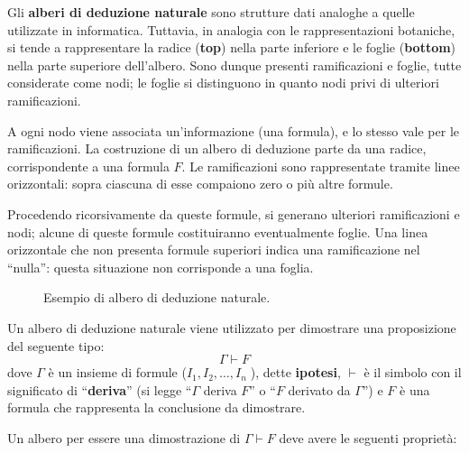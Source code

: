 \documentclass[
  a4paper,
]{article}
\newenvironment{scaledprooftree}[1]
  {\gdef\scalefactor{#1}\begin{center}\proofSkipAmount \leavevmode}%
  {\scalebox{\scalefactor}{\DisplayProof}\proofSkipAmount \end{center}}
\begin{document}
Gli \textbf{alberi di deduzione naturale} sono strutture dati analoghe a
quelle utilizzate in informatica. Tuttavia, in analogia con le
rappresentazioni botaniche, si tende a rappresentare la radice
(\textbf{top}) nella parte inferiore e le foglie (\textbf{bottom}) nella
parte superiore dell'albero. Sono dunque presenti ramificazioni e
foglie, tutte considerate come nodi; le foglie si distinguono in quanto
nodi privi di ulteriori ramificazioni.

A ogni nodo viene associata un'informazione (una formula), e lo stesso
vale per le ramificazioni. La costruzione di un albero di deduzione
parte da una radice, corrispondente a una formula \(F\). Le
ramificazioni sono rappresentate tramite linee orizzontali: sopra
ciascuna di esse compaiono zero o più altre formule.

Procedendo ricorsivamente da queste formule, si generano ulteriori
ramificazioni e nodi; alcune di queste formule costituiranno
eventualmente foglie. Una linea orizzontale che non presenta formule
superiori indica una ramificazione nel ``nulla'': questa situazione non
corrisponde a una foglia.

\begin{figure}[h]
\centering
\begin{scaledprooftree}{.95}
  \def\defaultHypSeparation{\hskip 0.4 cm}





\end{scaledprooftree}
\caption{Esempio di albero di deduzione naturale.}
\end{figure}

Un albero di deduzione naturale viene utilizzato per dimostrare una
proposizione del seguente tipo: \[
    \Gamma \vdash F
\] dove \(\Gamma\) è un insieme di formule (\(I_1, I_2,\dots, I_n \;\)),
dette \textbf{ipotesi}, \(\vdash\) è il simbolo con il significato di
``\textbf{deriva}'' (si legge ``\(\Gamma\) deriva \(F\)'' o ``\(F\)
derivato da \(\Gamma\)'') e \(F\) è una formula che rappresenta la
conclusione da dimostrare.

Un albero per essere una dimostrazione di \(\Gamma \vdash F\) deve avere
le seguenti proprietà:
\end{document}
